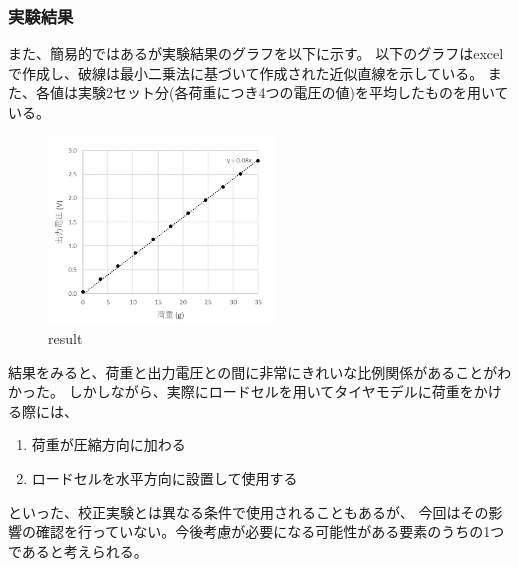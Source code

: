 \documentclass[twocolumn,a4j]{jsarticle}
\begin{document}
\subsubsection{実験結果}
また、簡易的ではあるが実験結果のグラフを以下に示す。
以下のグラフはexcelで作成し、破線は最小二乗法に基づいて作成された近似直線を示している。
また、各値は実験2セット分(各荷重につき4つの電圧の値)を平均したものを用いている。
\begin{figure}[htbp]
    \begin{center}
        \includegraphics[width=60mm]{images/result.jpg}
        \caption{result}
    \end{center}
\end{figure}
\newpage
結果をみると、荷重と出力電圧との間に非常にきれいな比例関係があることがわかった。
しかしながら、実際にロードセルを用いてタイヤモデルに荷重をかける際には、
\begin{enumerate}[(1)]
    \item 荷重が圧縮方向に加わる
    \item ロードセルを水平方向に設置して使用する
\end{enumerate}
といった、校正実験とは異なる条件で使用されることもあるが、
今回はその影響の確認を行っていない。今後考慮が必要になる可能性がある要素のうちの1つであると考えられる。\\
\end{document}
